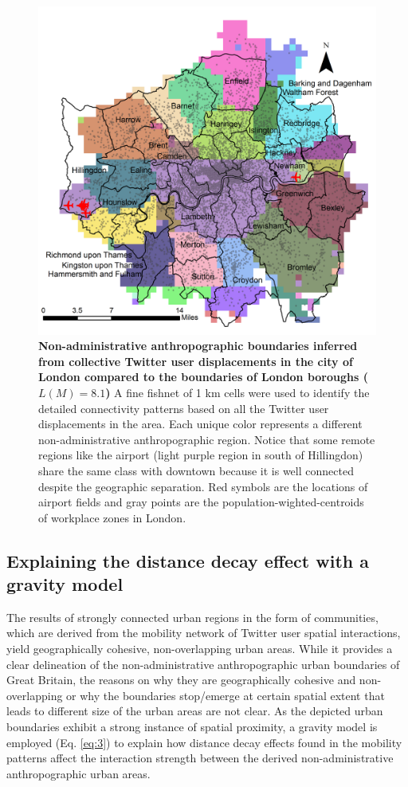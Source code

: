 \documentclass[]{tGIS2e}
\begin{document}
\begin{figure}
\begin{center}
\includegraphics[width=0.7\linewidth]{./figure/S7_london}
\caption{{\bf Non-administrative anthropographic boundaries inferred from collective Twitter user displacements in the city of London compared to the boundaries of London boroughs ($L(M)=8.1$)}  A fine fishnet of 1 km cells were used to identify the detailed connectivity patterns based on all the Twitter user displacements in the area.  Each unique color represents a different non-administrative anthropographic region. Notice that some remote regions like the airport (light purple region in south of Hillingdon) share the same class with downtown because it is well connected despite the geographic separation. Red symbols are the locations of airport fields and gray points are the population-wighted-centroids of workplace zones in London.}
\label{S7_Fig}
\end{center}
\end{figure}

\subsection{Explaining the distance decay effect with a gravity model}
The results of strongly connected urban regions in the form of communities, which are derived from the mobility network of Twitter user spatial interactions, yield geographically cohesive, non-overlapping urban areas. 
While it provides a clear delineation of the non-administrative anthropographic urban boundaries of Great Britain, the reasons on why they are geographically cohesive and non-overlapping or why the boundaries stop/emerge at certain spatial extent that leads to different size of the urban areas are not clear. 
As the depicted urban boundaries exhibit a strong instance of spatial proximity, a gravity model is employed (Eq. \eqref{eq:3}) to explain how distance decay effects found in the mobility patterns affect the interaction strength between the derived non-administrative anthropographic urban areas.
\end{document}
